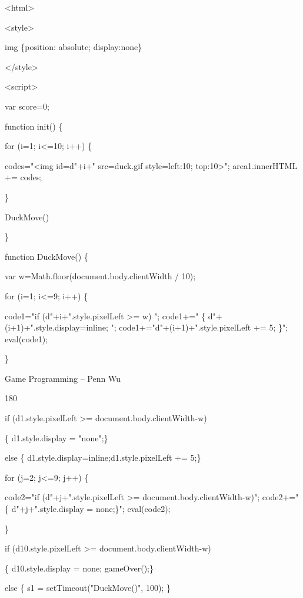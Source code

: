 \documentclass[
]{article}
\begin{document}
\textless html\textgreater{}

\textless style\textgreater{}

img \{position: absolute; display:none\}

\textless/style\textgreater{}

\textless script\textgreater{}

var score=0;

function init() \{

for (i=1; i\textless=10; i++) \{

codes="\textless img id=\textquotesingle d"+i+"\textquotesingle{}
src=\textquotesingle duck.gif\textquotesingle{}
style=\textquotesingle left:10; top:10\textquotesingle\textgreater";
area1.innerHTML += codes;

\}

DuckMove()

\}

function DuckMove() \{

var w=Math.floor(document.body.clientWidth / 10);

for (i=1; i\textless=9; i++) \{

code1="if (d"+i+".style.pixelLeft \textgreater= w) "; code1+=" \{
d"+(i+1)+".style.display=\textquotesingle inline\textquotesingle; ";
code1+="d"+(i+1)+".style.pixelLeft += 5; \}"; eval(code1);

\}

Game Programming -- Penn Wu

180

\protect\hypertarget{index_split_011.htmlux5cux23p181}{}{}

if (d1.style.pixelLeft \textgreater= document.body.clientWidth-w)

\{ d1.style.display = "none";\}

else \{
d1.style.display=\textquotesingle inline\textquotesingle;d1.style.pixelLeft
+= 5;\}

for (j=2; j\textless=9; j++) \{

code2="if (d"+j+".style.pixelLeft \textgreater=
document.body.clientWidth-w)"; code2+=" \{ d"+j+".style.display =
\textquotesingle none\textquotesingle;\}"; eval(code2);

\}

if (d10.style.pixelLeft \textgreater= document.body.clientWidth-w)

\{ d10.style.display = \textquotesingle none\textquotesingle;
gameOver();\}

else \{ s1 = setTimeout("DuckMove()", 100); \}
\end{document}
